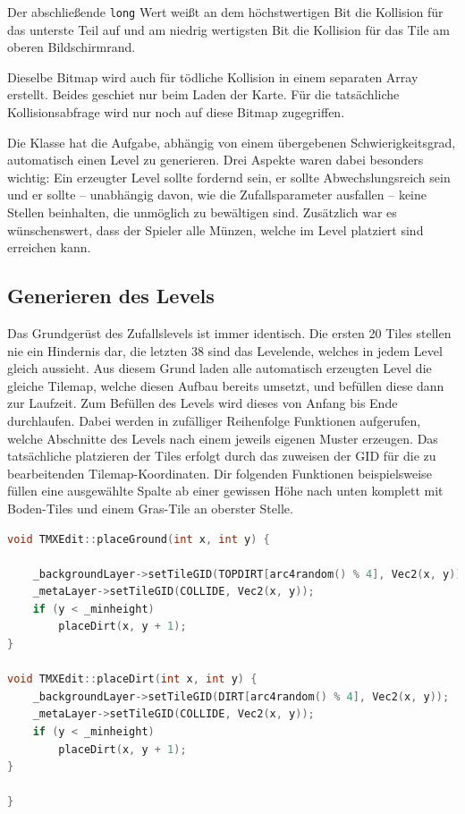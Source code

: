 Der abschließende \texttt{long} Wert weißt an dem höchstwertigen Bit die Kollision für das unterste Teil auf und am niedrig wertigsten Bit die Kollision für das Tile am oberen Bildschirmrand.

Dieselbe Bitmap wird auch für tödliche Kollision in einem separaten Array erstellt. Beides geschiet nur beim Laden der Karte. Für die tatsächliche Kollisionsabfrage wird nur noch auf diese Bitmap zugegriffen.


\label{sec:4_Automatisch erzeugte Tilemapst}

Die   Klasse hat die Aufgabe, abhängig von einem übergebenen Schwierigkeitsgrad, automatisch einen Level zu generieren. Drei Aspekte waren dabei besonders wichtig: Ein erzeugter Level sollte fordernd sein, er sollte Abwechslungsreich sein und er sollte – unabhängig davon, wie die Zufallsparameter ausfallen – keine Stellen beinhalten, die unmöglich zu bewältigen sind. Zusätzlich war es wünschenswert, dass der Spieler alle Münzen, welche im Level platziert sind erreichen kann.


\subsection{Generieren des Levels}
Das Grundgerüst des Zufallslevels ist immer identisch. Die ersten 20 Tiles stellen nie ein Hindernis dar, die letzten 38 sind das Levelende, welches in jedem Level gleich aussieht. Aus diesem Grund laden alle automatisch erzeugten Level die gleiche Tilemap, welche diesen Aufbau bereits umsetzt, und befüllen diese dann zur Laufzeit.
Zum Befüllen des Levels wird dieses von Anfang bis Ende durchlaufen.  Dabei werden in zufälliger Reihenfolge Funktionen aufgerufen, welche Abschnitte des Levels nach einem jeweils eigenen Muster erzeugen. Das tatsächliche platzieren der Tiles erfolgt durch das zuweisen der GID für die zu bearbeitenden Tilemap-Koordinaten. 
Dir folgenden Funktionen beispielsweise füllen eine ausgewählte Spalte ab einer gewissen Höhe
nach unten komplett mit Boden-Tiles und einem Gras-Tile an oberster Stelle.
\begin{lstlisting}[label=lst:place_ground,
				   language=C++,
				   firstnumber=127,
				   caption=Platzieren von Boden-Tiles ( TMXEdit.cpp )]
void TMXEdit::placeGround(int x, int y) {

	_backgroundLayer->setTileGID(TOPDIRT[arc4random() % 4], Vec2(x, y));
	_metaLayer->setTileGID(COLLIDE, Vec2(x, y));
	if (y < _minheight)
		placeDirt(x, y + 1);
}

void TMXEdit::placeDirt(int x, int y) {
	_backgroundLayer->setTileGID(DIRT[arc4random() % 4], Vec2(x, y));
	_metaLayer->setTileGID(COLLIDE, Vec2(x, y));
	if (y < _minheight)
		placeDirt(x, y + 1);
}

}
\end{lstlisting}

